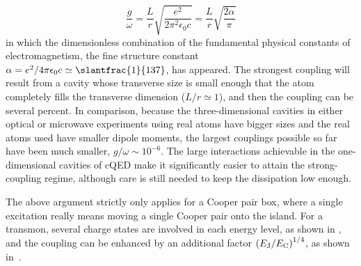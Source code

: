 \begin{equation}
    \label{eq:strong}
    \frac{g}{\omega}=\frac{L}{r}\sqrt{\frac{e^2}{2\pi^2\epsilon_0 c}}=\frac{L}{r}\sqrt{\frac{2\alpha}{\pi}}
\end{equation}%
%
in which the dimensionless combination of the fundamental physical constants of electromagnetism, the fine structure constant
$\alpha=e^2/4\pi\epsilon_0 c\simeq \slantfrac{1}{137}$, has appeared. The strongest coupling will result from a cavity whose transverse size is small enough that the atom completely fills the transverse dimension ($L/r\simeq1$), and then the coupling can be several percent. In comparison, because the three-dimensional cavities in either optical or microwave experiments using real atoms have bigger sizes and the real atoms used have smaller dipole moments, the largest couplings possible so far have been much smaller, $g/\omega\sim10^{-6}$. The large interactions achievable in the one-dimensional cavities of cQED make it significantly easier to attain the strong-coupling regime, although care is still needed to keep the dissipation low enough.

The above argument strictly only applies for a Cooper pair box, where a single excitation really means moving a single Cooper pair onto the island. For a transmon, several charge states are involved in each energy level, as shown in , and the coupling can be enhanced by an additional factor ${(E_{\text{J}}/E_{\text{C}})}^{1/4}$, as shown in~.

